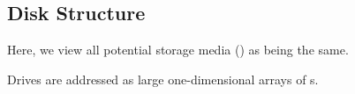 \subsection{Disk Structure}\label{subsec:Disk_Structure}
Here, we view all potential storage media () as being the same.

Drives are addressed as large one-dimensional arrays of s.


